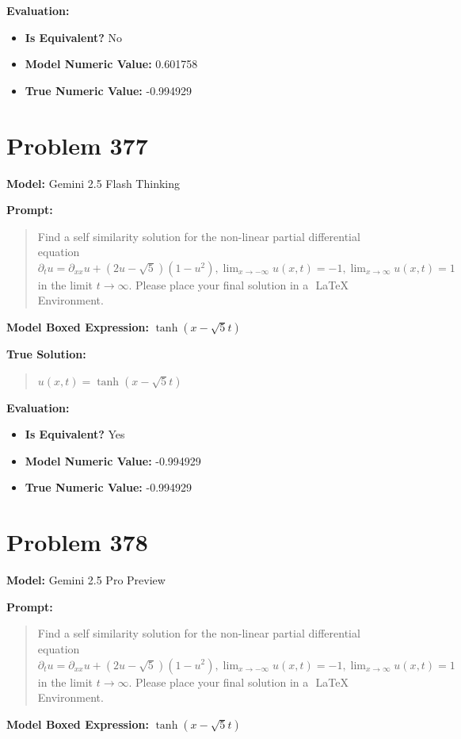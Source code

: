 \documentclass{article}
\begin{document}
{\textbf{Evaluation:}
\begin{itemize}
\item \textbf{Is Equivalent?} No
\item \textbf{Model Numeric Value:} 0.601758
\item \textbf{True Numeric Value:} -0.994929
\end{itemize}
\vspace{1cm}
\section*{Problem 377}
\textbf{Model:} Gemini 2.5 Flash Thinking

\textbf{Prompt:}
\begin{quote}
Find a self similarity solution for the non-linear partial differential equation $ \partial_t u = \partial_{xx} u + (2u-\sqrt{5})(1-u^2), \lim_{x \to -\infty} u(x,t) = -1, \lim_{x \to \infty} u(x,t) = 1 $ in the limit $t \rightarrow \infty$. Please place your final solution in a $\boxed{}$ LaTeX Environment.
\end{quote}
\textbf{Model Boxed Expression:} $\tanh(x-\sqrt{5}t)$

\textbf{True Solution:}
\begin{quote}
$u(x,t)=\tanh(x-\sqrt{5}t)$
\end{quote}

\textbf{Evaluation:}
\begin{itemize}
\item \textbf{Is Equivalent?} Yes
\item \textbf{Model Numeric Value:} -0.994929
\item \textbf{True Numeric Value:} -0.994929
\end{itemize}
\vspace{1cm}
\section*{Problem 378}
\textbf{Model:} Gemini 2.5 Pro Preview

\textbf{Prompt:}
\begin{quote}
Find a self similarity solution for the non-linear partial differential equation $ \partial_t u = \partial_{xx} u + (2u-\sqrt{5})(1-u^2), \lim_{x \to -\infty} u(x,t) = -1, \lim_{x \to \infty} u(x,t) = 1 $ in the limit $t \rightarrow \infty$. Please place your final solution in a $\boxed{}$ LaTeX Environment.
\end{quote}
\textbf{Model Boxed Expression:} $\tanh(x-\sqrt{5}t)$

}
\end{document}

